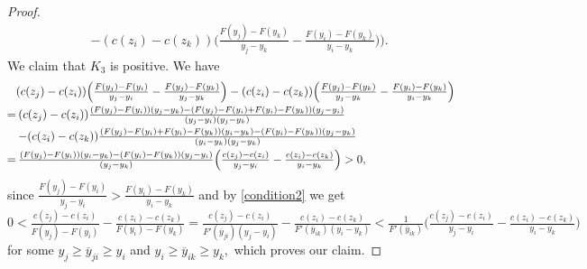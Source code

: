 \documentclass[12pt,reqno]{amsart}
\begin{document}
\begin{proof}
\[\begin{array}{ll}
&-(c(z_i)-c(z_k))\Big(\frac{F(y_j)-F(y_k)}{y_j-y_k}-\frac{F(y_i)-F(y_k)}{y_i-y_k}\Big)\Big).
\end{array}\] 
  We claim that $K_3$ is positive. We have %
\begin{equation}\label{H1}\hspace{-6pt}\begin{array}{ll}
&\hspace{-10pt}(c(z_j)-c(z_i))\Big(\frac{F(y_j)-F(y_i)}{y_j-y_i}-\frac{F(y_j)-F(y_k)}{y_j-y_k}\Big)-(c(z_i)-c(z_k))\Big(\frac{F(y_j)-F(y_k)}{y_j-y_k}-\frac{F(y_i)-F(y_k)}{y_i-y_k}\Big)\vspace{3pt}\\
=&\hspace{-8pt}(c(z_j)-c(z_i))\frac{(F(y_j)-F(y_i))(y_j-y_k)-(F(y_j)-F(y_i)+F(y_i)-F(y_k))(y_j-y_i)}{(y_j-y_i)(y_j-y_k)}\vspace{3pt}\\
&\hspace{-8pt}-(c(z_i)-c(z_k))\frac{(F(y_j)-F(y_i)+F(y_i)-F(y_k))(y_i-y_k)-(F(y_i)-F(y_k))(y_j-y_k)}{(y_i-y_k)(y_j-y_k)}\vspace{3pt}\\
=&\hspace{-8pt}\frac{(F(y_j)-F(y_i))(y_i-y_k)-(F(y_i)-F(y_k))(y_j-y_i)}{(y_j-y_k)}\Big(\frac{c(z_j)-c(z_i)}{y_j-y_i}-\frac{c(z_i)-c(z_k)}{y_i-y_k}\Big)>0,
\end{array}
\end{equation}
 since $\frac{F(y_j)-F(y_i)}{y_j-y_i}>\frac{F(y_i)-F(y_k)}{y_i-y_k}$ and by \ref{condition2} we get
$0<\frac{c(z_j)-c(z_i)}{F(y_j)-F(y_i)}-\frac{c(z_i)-c(z_k)}{F(y_i)-F(y_k)}
=\frac{c(z_j)-c(z_i)}{F'(\overline{y}_{ji})(y_j-y_i)}-\frac{c(z_i)-c(z_k)}{F'(\overline{y}_{ik})(y_i-y_k)}<\frac{1}{F'(\overline{y}_{ik})}\big(\frac{c(z_j)-c(z_i)}{y_j-y_i}-\frac{c(z_i)-c(z_k)}{y_i-y_k}\big)$
for some $y_j\ge\overline{y}_{ji}\ge y_i$ and $y_i\ge \overline{y}_{ik}\ge y_k,$ which proves our claim.


\end{proof}
\end{document}
